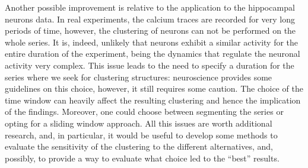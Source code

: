 Another possible improvement is relative to the application to the hippocampal neurons data. In real experiments, the calcium traces are recorded for very long periods of time, however, the clustering of neurons can not be performed on the whole series. It is, indeed, unlikely that neurons exhibit a similar activity for the entire duration of the experiment, being the dynamics that regulate the neuronal activity very complex. This issue leads to the need to specify a duration for the series where we seek for clustering structures: neuroscience provides some guidelines on this choice, however, it still requires some caution. The choice of the time window can heavily affect the resulting clustering and hence the implication of the findings. Moreover, one could choose between segmenting the series or opting for a sliding window approach. All this issues are worth additional research, and, in particular, it would be useful to develop some methods to evaluate the sensitivity of the clustering to the different alternatives, and, possibly, to provide a way to evaluate what choice led to the ``best'' results.





